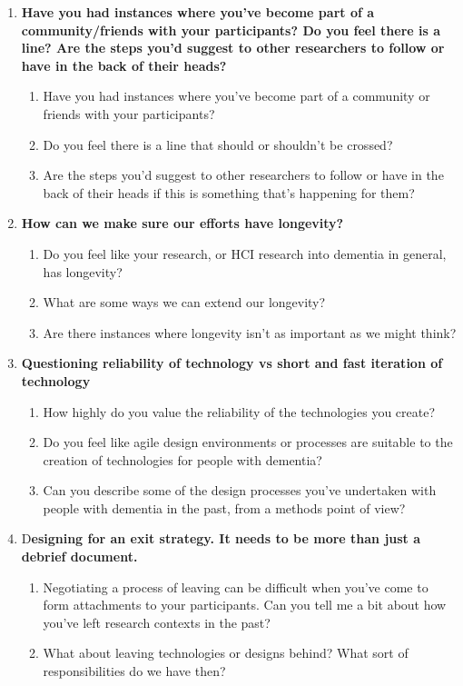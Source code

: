 \begin{enumerate}
    \item \textbf{Have you had instances where you’ve become part of a community/friends with your participants? Do you feel there is a line? Are the steps you’d suggest to other researchers to follow or have in the back of their heads?}
    \begin{enumerate}
        \item Have you had instances where you’ve become part of a community or friends with your participants?
        \item Do you feel there is a line that should or shouldn’t be crossed?
        \item Are the steps you’d suggest to other researchers to follow or have in the back of their heads if this is something that’s happening for them?
    \end{enumerate}

    \item \textbf{How can we make sure our efforts have longevity?}
    \begin{enumerate}
        \item Do you feel like your research, or HCI research into dementia in general, has longevity?
        \item What are some ways we can extend our longevity?
        \item Are there instances where longevity isn’t as important as we might think?
    \end{enumerate}

    \item \textbf{Questioning reliability of technology vs short and fast iteration of technology}
    \begin{enumerate}
        \item How highly do you value the reliability of the technologies you create?
        \item Do you feel like agile design environments or processes are suitable to the creation of technologies for people with dementia?
        \item Can you describe some of the design processes you’ve undertaken with people with dementia in the past, from a methods point of view?
    \end{enumerate}

    \item D\textbf{esigning for an exit strategy. It needs to be more than just a debrief document.}
    \begin{enumerate}
        \item Negotiating a process of leaving can be difficult when you’ve come to form attachments to your participants. Can you tell me a bit about how you’ve left research contexts in the past?
        \item What about leaving technologies or designs behind? What sort of responsibilities do we have then?
    \end{enumerate}


\end{enumerate}
